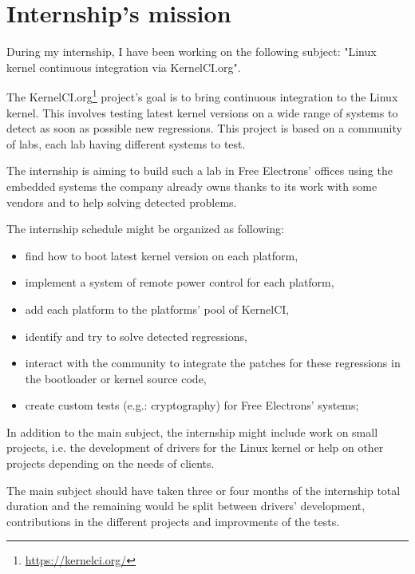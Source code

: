 \chapter{Internship's mission}

During my internship, I have been working on the following subject: "Linux kernel continuous integration via KernelCI.org".

The KernelCI.org\footnote{\url{https://kernelci.org/}} project's goal is to bring continuous integration to the Linux kernel. This involves testing latest kernel versions on a wide range of systems to detect as soon as possible new regressions. This project is based on a community of labs, each lab having different systems to test.

The internship is aiming to build such a lab in Free Electrons' offices using the embedded systems the company already owns thanks to its work with some vendors and to help solving detected problems.

The internship schedule might be organized as following:
\begin{itemize}
  \item find how to boot latest kernel version on each platform,
  \item implement a system of remote power control for each platform,
  \item add each platform to the platforms' pool of KernelCI,
  \item identify and try to solve detected regressions,
  \item interact with the community to integrate the patches for these regressions in the bootloader or kernel source code,
  \item create custom tests (e.g.: cryptography) for Free Electrons' systems;
\end{itemize}

In addition to the main subject, the internship might include work on small projects, i.e. the development of drivers for the Linux kernel or help on other projects depending on the needs of clients.

The main subject should have taken three or four months of the internship total duration and the remaining would be split between drivers' development, contributions in the different projects and improvments of the tests.
